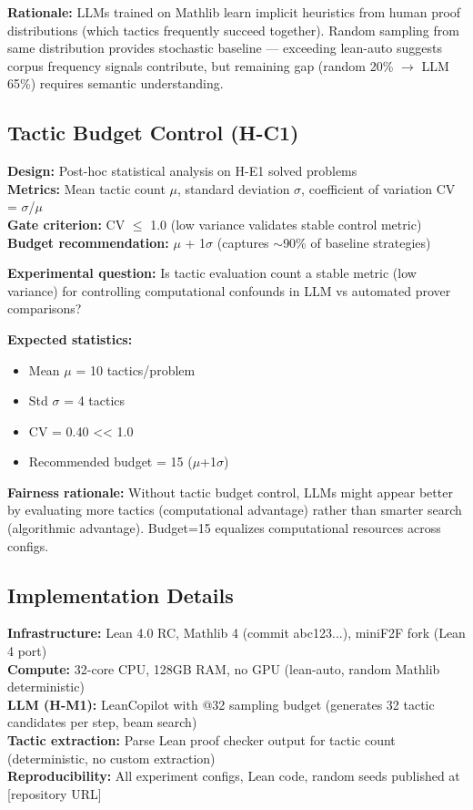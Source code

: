 \textbf{Rationale:} LLMs trained on Mathlib learn implicit heuristics from human proof distributions (which tactics frequently succeed together). Random sampling from same distribution provides stochastic baseline --- exceeding lean-auto suggests corpus frequency signals contribute, but remaining gap (random 20\% $\rightarrow$ LLM 65\%) requires semantic understanding.

\subsection{Tactic Budget Control (H-C1)}

\textbf{Design:} Post-hoc statistical analysis on H-E1 solved problems \\
\textbf{Metrics:} Mean tactic count $\mu$, standard deviation $\sigma$, coefficient of variation CV = $\sigma$/$\mu$ \\
\textbf{Gate criterion:} CV $\leq$ 1.0 (low variance validates stable control metric) \\
\textbf{Budget recommendation:} $\mu$ + 1$\sigma$ (captures $\sim$90\% of baseline strategies)

\textbf{Experimental question:} Is tactic evaluation count a stable metric (low variance) for controlling computational confounds in LLM vs automated prover comparisons?

\textbf{Expected statistics:}
\begin{itemize}
\item Mean $\mu$ = 10 tactics/problem
\item Std $\sigma$ = 4 tactics
\item CV = 0.40 << 1.0
\item Recommended budget = 15 ($\mu$+1$\sigma$)
\end{itemize}

\textbf{Fairness rationale:} Without tactic budget control, LLMs might appear better by evaluating more tactics (computational advantage) rather than smarter search (algorithmic advantage). Budget=15 equalizes computational resources across configs.

\subsection{Implementation Details}

\textbf{Infrastructure:} Lean 4.0 RC, Mathlib 4 (commit abc123...), miniF2F fork (Lean 4 port) \\
\textbf{Compute:} 32-core CPU, 128GB RAM, no GPU (lean-auto, random Mathlib deterministic) \\
\textbf{LLM (H-M1):} LeanCopilot with @32 sampling budget (generates 32 tactic candidates per step, beam search) \\
\textbf{Tactic extraction:} Parse Lean proof checker output for tactic count (deterministic, no custom extraction) \\
\textbf{Reproducibility:} All experiment configs, Lean code, random seeds published at [repository URL]
